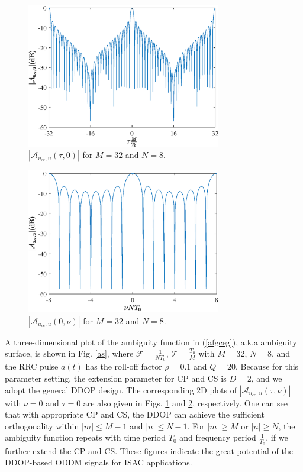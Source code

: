 \documentclass[journal]{IEEEtran}
\begin{document}
{\begin{figure}
\end{figure}

\begin{figure}
  \centering
  \includegraphics[width=8.5cm]{ambiguity_tau}
  \caption{$\left|\mathcal A_{u_{ce},u}\left(\tau,0\right)\right|$ for $M=32$ and $N=8$.}
  \label{as_n0}
\end{figure}

\begin{figure}
  \centering
  \includegraphics[width=8.5cm]{ambiguity_nu}
  \caption{$\left|\mathcal A_{u_{ce},u}\left(0,\nu\right)\right|$ for $M=32$ and $N=8$.}
  \label{as_m0}
\end{figure}

A three-dimensional plot of the ambiguity function in (\ref{afgceg}), a.k.a ambiguity surface\cite{ofdmvsfbmc}, is shown in Fig. \ref{as}, where $\mathcal F=\frac{1}{NT_0}$, $\mathcal T=\frac{T_0}{M}$ with $M=32$, $N=8$, and the RRC pulse $a(t)$ has the roll-off factor $\rho=0.1$ and $Q=20$. Because for this parameter setting, the extension parameter for CP and CS is $D=2$, and we adopt the general DDOP design. The corresponding 2D plots of $\left|\mathcal A_{u_{ce},u}\left(\tau,\nu\right)\right|$ with $\nu=0$ and $\tau=0$ are also given in Figs. \ref{as_n0} and \ref{as_m0}, respectively. One can see that with appropriate CP and CS, the DDOP can achieve the sufficient orthogonality within $|m|\le M-1$ and $|n|\le N-1$. For $|m|\ge M$ or $|n|\ge N$, the ambiguity function repeats with time period $T_0$ and frequency period $\frac{1}{T_0}$, if we further extend
the CP and CS. These figures indicate the great potential of the DDOP-based ODDM signals for ISAC applications.





}
\end{document}
